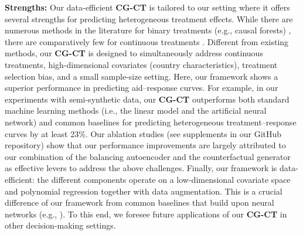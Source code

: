 \documentclass[sigconf]{acmart}
\newcommand{\framework}{\textbf{\mbox{CG-CT}}\xspace}
\begin{document}
\textbf{Strengths:} Our data-efficient \framework is tailored to our setting where it offers several strengths for predicting heterogeneous treatment effects. While there are numerous methods in the literature for binary treatments (e.g., causal forests) \cite{Johansson2016, Shalit2017, Yoon2018, Athey2019, Hatt2021}, there are comparatively few for continuous treatments \cite{Hirano2004, Schwab2020, Bica2020}. Different from existing methods, our \framework is designed to simultaneously address continuous treatments, high-dimensional covariates (country characteristics), treatment selection bias, and a small sample-size setting. Here, our framework shows a superior performance in predicting aid--response curves. For example, in our experiments with semi-synthetic data, our \framework outperforms both standard machine learning methods (i.e., the linear model and the artificial neural network) and common baselines for predicting heterogeneous treatment--response curves \cite{Hirano2004, Schwab2020, Bica2020} by at least 23\%. Our ablation studies (see supplements in our GitHub repository) show that our performance improvements are largely attributed to our combination of the balancing autoencoder and the counterfactual generator as effective levers to address the above challenges. Finally, our framework is data-efficient: the different components operate on a low-dimensional covariate space and polynomial regression together with data augmentation. This is a crucial difference of our framework from common baselines that build upon neural networks (e.g., \cite{Bica2020,Schwab2020}). To this end, we foresee future applications of our \framework in other decision-making settings. 

\end{document}
